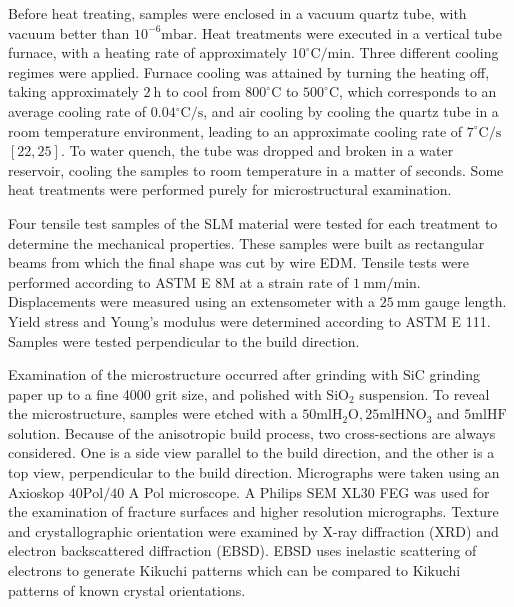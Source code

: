 \documentclass[10pt]{article}
\begin{document}
Before heat treating, samples were enclosed in a vacuum quartz tube, with vacuum better than $10^{-6} \mathrm{mbar}$. Heat treatments were executed in a vertical tube furnace, with a heating rate of approximately $10^{\circ} \mathrm{C} / \mathrm{min}$. Three different cooling regimes were applied. Furnace cooling was attained by turning the heating off, taking approximately $2 \mathrm{~h}$ to cool from $800^{\circ} \mathrm{C}$ to $500^{\circ} \mathrm{C}$, which corresponds to an average cooling rate of $0.04{ }^{\circ} \mathrm{C} / \mathrm{s}$, and air cooling by cooling the quartz tube in a room temperature environment, leading to an approximate cooling rate of $7^{\circ} \mathrm{C} / \mathrm{s}$ $[22,25]$. To water quench, the tube was dropped and broken in a water reservoir, cooling the samples to room temperature in a matter of seconds. Some heat treatments were performed purely for microstructural examination.

Four tensile test samples of the SLM material were tested for each treatment to determine the mechanical properties. These samples were built as rectangular beams from which the final shape was cut by wire EDM. Tensile tests were performed according to ASTM E 8M at a strain rate of $1 \mathrm{~mm} / \mathrm{min}$. Displacements were measured using an extensometer with a $25 \mathrm{~mm}$ gauge length. Yield stress and Young's modulus were determined according to ASTM E 111. Samples were tested perpendicular to the build direction.

Examination of the microstructure occurred after grinding with $\mathrm{SiC}$ grinding paper up to a fine 4000 grit size, and polished with $\mathrm{SiO}_{2}$ suspension. To reveal the microstructure, samples were etched with a $50 \mathrm{ml} \mathrm{H}_{2} \mathrm{O}, 25 \mathrm{ml} \mathrm{HNO}_{3}$ and $5 \mathrm{ml} \mathrm{HF}$ solution. Because of the anisotropic build process, two cross-sections are always considered. One is a side view parallel to the build direction, and the other is a top view, perpendicular to the build direction. Micrographs were taken using an Axioskop $40 \mathrm{Pol} / 40$ A Pol microscope. A Philips SEM XL30 FEG was used for the examination of fracture surfaces and higher resolution micrographs. Texture and crystallographic orientation were examined by X-ray diffraction (XRD) and electron backscattered diffraction (EBSD). EBSD uses inelastic scattering of electrons to generate Kikuchi patterns which can be compared to Kikuchi patterns of known crystal orientations.
\end{document}

